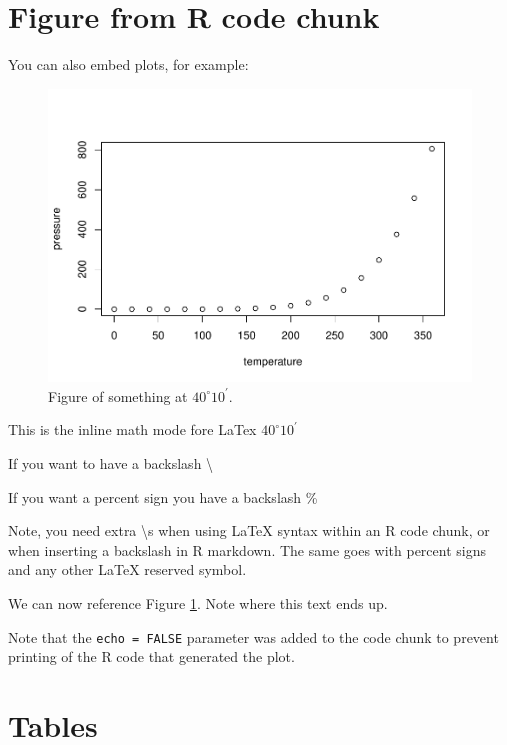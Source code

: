 \documentclass[12pt,]{article}
\begin{document}
\FloatBarrier

\section{Figure from R code chunk}\label{figure-from-r-code-chunk}

You can also embed plots, for example:

\begin{figure}[htbp]
\centering
\includegraphics{4-Workshop_examples_files/figure-latex/pressure-1.pdf}
\caption{Figure of something at \(40^\circ 10^\prime\).
\label{fig:pressure}}
\end{figure}

This is the inline math mode fore LaTex \(40^\circ 10^\prime\)

If you want to have a backslash \textbackslash{}

If you want a percent sign you have a backslash \%

Note, you need extra \textbackslash{}s when using LaTeX syntax within an
R code chunk, or when inserting a backslash in R markdown. The same goes
with percent signs and any other LaTeX reserved symbol.

\FloatBarrier

We can now reference Figure \ref{fig:pressure}. Note where this text
ends up.

Note that the \texttt{echo\ =\ FALSE} parameter was added to the code
chunk to prevent printing of the R code that generated the plot.

\section{Tables}\label{tables}
\end{document}
